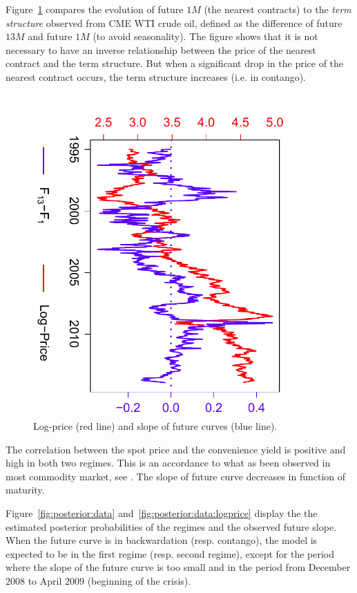 \documentclass[nolayout]{article}
\theoremstyle{plain}
\theoremstyle{definition}
\newcommand{\1}{\mathbbm{1}}
\begin{document}
Figure~\ref{fig:LogPriceTermStructure:data} compares the evolution of future $1M$ (the nearest contracts) to the \emph{term structure} observed from CME WTI crude oil, defined as the difference of future $13M$ and future $1M$ (to avoid seasonality). The figure shows that it is not necessary to have an inverse relationship between the  price of the nearest contract and the term structure. But when a significant drop in the price  of the nearest contract occurs, the term structure increases (i.e. in contango).
\begin{figure}
\centering
\includegraphics[scale=.6,angle=90]{LogPrice_TermStructure}
\caption{Log-price (red line) and slope of future curves (blue line).}
\label{fig:LogPriceTermStructure:data}
\end{figure}



The correlation between the spot price and the convenience yield is positive and high in both two regimes. This is an accordance to what as been observed in most commodity market, see \cite{gibson:schwartz:1990}.  The slope of future curve decreases in function of maturity. 

Figure~\ref{fig:posterior:data} and~\ref{fig:posterior:data:logprice} display the the estimated posterior probabilities of the regimes and the observed future slope. When the future curve is in backwardation (resp. contango), the model is expected to be in the first regime (resp. second regime), except for the period where the slope of the future curve is too small and in the period from December $2008$ to April $2009$ (beginning of the crisis).
\end{document}
